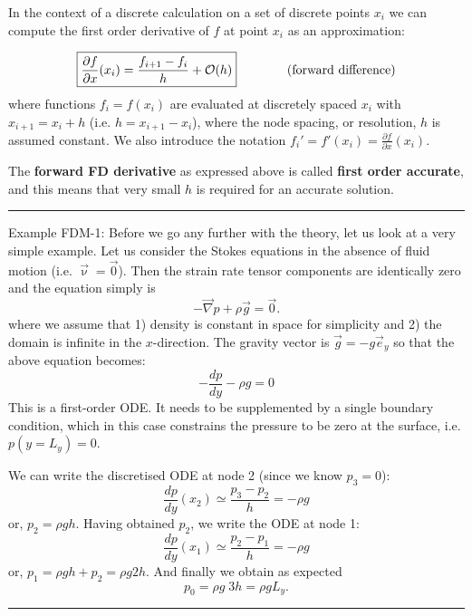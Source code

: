 \noindent In the context of a discrete calculation on a set of discrete points $x_i$
we can compute the first order derivative of $f$ at point $x_i$ as an approximation:

\begin{equation}
\boxed{
\frac{\partial f}{\partial x}(x_i) = \frac{f_{i+1}-f_i}{h} + {\cal O}(h) 
}
\qquad
\qquad
\text{(forward difference)} 
\end{equation}
where functions $f_i = f (x_i)$ are evaluated at discretely spaced $x_i$ with $x_{i+1} = x_i + h$ 
(i.e. $h=x_{i+1}-x_i$), where the node spacing, or resolution, $h$ is assumed constant.
We also introduce the notation $f_i'=f'(x_i)=\frac{\partial f}{\partial x} (x_i)$. 


The {\bf forward FD derivative} as expressed above is called {\bf first order accurate},
and this means that very small $h$ is required for an accurate solution.

\begin{center}
\begin{minipage}[t]{0.77\textwidth}
\par\noindent\rule{\textwidth}{0.4pt}
{\color{blue}Example FDM-1:} Before we go any further with the theory, let us look at a very simple example. 
Let us consider the Stokes equations in the absence of fluid motion (i.e. $\vec\upnu=\vec 0$).
Then the strain rate tensor components are identically zero and the equation simply is 
\begin{equation}
-\vec\nabla p + \rho \vec{g} = \vec 0.
\end{equation}
where we assume that 1) density is constant in space for simplicity and 2)
the domain is infinite in the $x$-direction.
The gravity vector is $\vec{g}=-g \vec{e}_y$ so that the above equation 
becomes:
\begin{equation}
-\frac{dp}{dy} - \rho g = 0
\end{equation}
This is a first-order ODE. It needs to be supplemented by a single boundary condition, 
which in this case constrains the pressure to be zero at the surface, i.e. $p(y=L_y)=0$.



We can write the discretised ODE at node 2 (since we know $p_3=0$):
\begin{equation}
\frac{dp}{dy}(x_2) \simeq \frac{p_3-p_2}{h} = -\rho g
\end{equation}
or, $p_2=\rho g h$. Having obtained $p_2$, we write the ODE at node 1:
\begin{equation}
\frac{dp}{dy}(x_1) \simeq \frac{p_2-p_1}{h} = -\rho g
\end{equation}
or, $p_1= \rho g h + p_2 = \rho g 2h$. And finally we obtain as expected
\begin{equation}
p_0 = \rho g \; 3h = \rho g L_y.
\end{equation}

\par\noindent\rule{\textwidth}{0.4pt}
\end{minipage}
\end{center}

